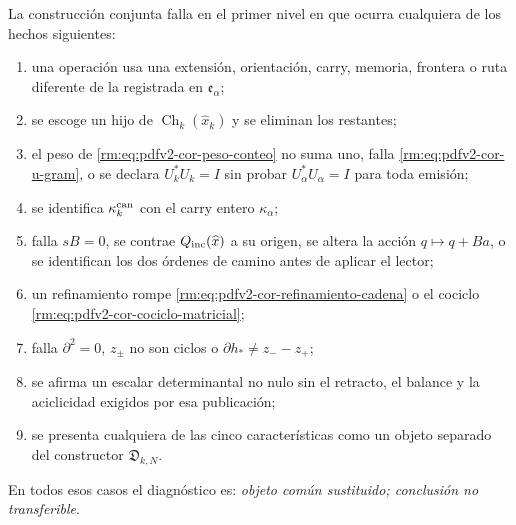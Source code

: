 \begin{criterion}
\label{rm:crit:pdfv2-cor-falsadores}
La construcción conjunta falla en el primer nivel en que ocurra cualquiera de
los hechos siguientes:
\begin{enumerate}
 \item una operación usa una extensión, orientación, carry, memoria, frontera
 o ruta diferente de la registrada en \(\mathfrak e_\alpha\);
 \item se escoge un hijo de
 \(\operatorname{Ch}_k(\widehat x_k)\) y se eliminan los restantes;
 \item el peso de \eqref{rm:eq:pdfv2-cor-peso-conteo} no suma uno, falla
 \eqref{rm:eq:pdfv2-cor-u-gram}, o se declara \(U_k^*U_k=I\) sin probar
 \(U_\alpha^*U_\alpha=I\) para toda emisión;
 \item se identifica \(\kappa_k^{\rm can}\) con el carry entero
 \(\kappa_\alpha\);
 \item falla \(sB=0\), se contrae
 \(Q_{\rm inc}(\widehat x)\) a su origen, se altera la acción
 \(q\mapsto q+Ba\), o se identifican los dos órdenes de camino antes de
 aplicar el lector;
 \item un refinamiento rompe
 \eqref{rm:eq:pdfv2-cor-refinamiento-cadena} o el cociclo
 \eqref{rm:eq:pdfv2-cor-cociclo-matricial};
 \item falla \(\partial^2=0\), \(z_\pm\) no son ciclos o
 \(\partial h_*\neq z_--z_+\);
 \item se afirma un escalar determinantal no nulo sin el retracto, el
 balance y la aciclicidad exigidos por esa publicación;
 \item se presenta cualquiera de las cinco características como un objeto
 separado del constructor \(\mathfrak D_{k,N}\).
\end{enumerate}
En todos esos casos el diagnóstico es: \emph{objeto común sustituido;
conclusión no transferible}.
\end{criterion}
